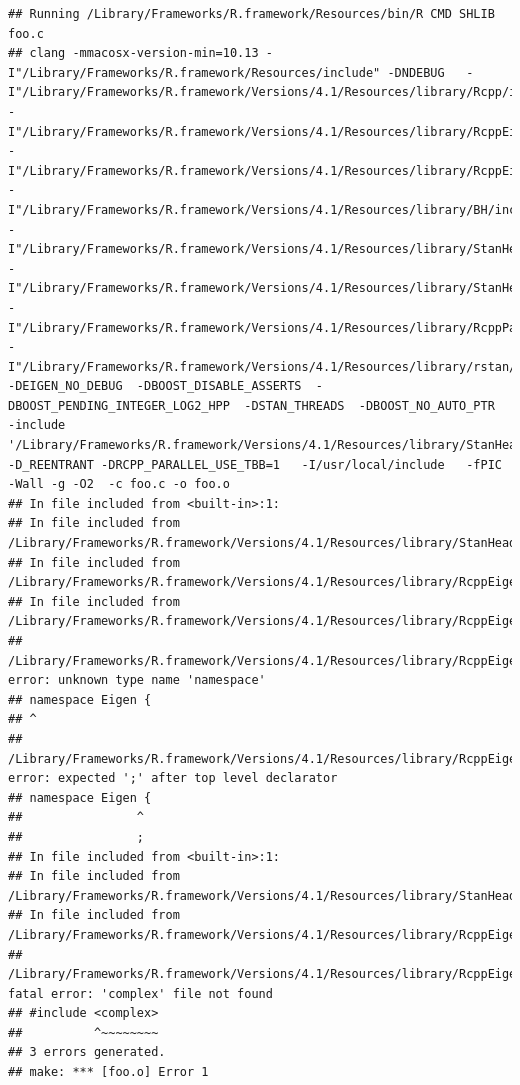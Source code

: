 \documentclass[
]{article}
\begin{document}
\begin{verbatim}
## Running /Library/Frameworks/R.framework/Resources/bin/R CMD SHLIB foo.c
## clang -mmacosx-version-min=10.13 -I"/Library/Frameworks/R.framework/Resources/include" -DNDEBUG   -I"/Library/Frameworks/R.framework/Versions/4.1/Resources/library/Rcpp/include/"  -I"/Library/Frameworks/R.framework/Versions/4.1/Resources/library/RcppEigen/include/"  -I"/Library/Frameworks/R.framework/Versions/4.1/Resources/library/RcppEigen/include/unsupported"  -I"/Library/Frameworks/R.framework/Versions/4.1/Resources/library/BH/include" -I"/Library/Frameworks/R.framework/Versions/4.1/Resources/library/StanHeaders/include/src/"  -I"/Library/Frameworks/R.framework/Versions/4.1/Resources/library/StanHeaders/include/"  -I"/Library/Frameworks/R.framework/Versions/4.1/Resources/library/RcppParallel/include/"  -I"/Library/Frameworks/R.framework/Versions/4.1/Resources/library/rstan/include" -DEIGEN_NO_DEBUG  -DBOOST_DISABLE_ASSERTS  -DBOOST_PENDING_INTEGER_LOG2_HPP  -DSTAN_THREADS  -DBOOST_NO_AUTO_PTR  -include '/Library/Frameworks/R.framework/Versions/4.1/Resources/library/StanHeaders/include/stan/math/prim/mat/fun/Eigen.hpp'  -D_REENTRANT -DRCPP_PARALLEL_USE_TBB=1   -I/usr/local/include   -fPIC  -Wall -g -O2  -c foo.c -o foo.o
## In file included from <built-in>:1:
## In file included from /Library/Frameworks/R.framework/Versions/4.1/Resources/library/StanHeaders/include/stan/math/prim/mat/fun/Eigen.hpp:13:
## In file included from /Library/Frameworks/R.framework/Versions/4.1/Resources/library/RcppEigen/include/Eigen/Dense:1:
## In file included from /Library/Frameworks/R.framework/Versions/4.1/Resources/library/RcppEigen/include/Eigen/Core:88:
## /Library/Frameworks/R.framework/Versions/4.1/Resources/library/RcppEigen/include/Eigen/src/Core/util/Macros.h:628:1: error: unknown type name 'namespace'
## namespace Eigen {
## ^
## /Library/Frameworks/R.framework/Versions/4.1/Resources/library/RcppEigen/include/Eigen/src/Core/util/Macros.h:628:16: error: expected ';' after top level declarator
## namespace Eigen {
##                ^
##                ;
## In file included from <built-in>:1:
## In file included from /Library/Frameworks/R.framework/Versions/4.1/Resources/library/StanHeaders/include/stan/math/prim/mat/fun/Eigen.hpp:13:
## In file included from /Library/Frameworks/R.framework/Versions/4.1/Resources/library/RcppEigen/include/Eigen/Dense:1:
## /Library/Frameworks/R.framework/Versions/4.1/Resources/library/RcppEigen/include/Eigen/Core:96:10: fatal error: 'complex' file not found
## #include <complex>
##          ^~~~~~~~~
## 3 errors generated.
## make: *** [foo.o] Error 1
\end{verbatim}
\end{document}
